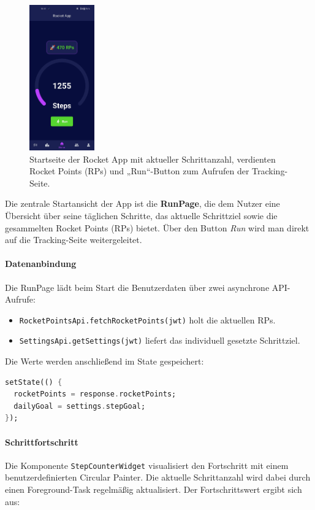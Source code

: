 \documentclass[11pt,a4paper]{article}
\begin{document}
\begin{figure}[H]
    \centering
    \includegraphics[width=0.25\textwidth]{images/apps/start-page.jpg}
    \caption{Startseite der Rocket App mit aktueller Schrittanzahl, verdienten Rocket Points (RPs) und „Run“-Button zum Aufrufen der Tracking-Seite.}
    \label{fig:validation-workflow}
\end{figure}

Die zentrale Startansicht der App ist die \textbf{RunPage}, die dem Nutzer eine Übersicht über seine täglichen Schritte, das aktuelle Schrittziel sowie die gesammelten Rocket Points (RPs) bietet. Über den Button \textit{Run} wird man direkt auf die Tracking-Seite weitergeleitet.

\paragraph{Datenanbindung}
Die RunPage lädt beim Start die Benutzerdaten über zwei asynchrone API-Aufrufe:
\begin{itemize}
    \item \texttt{RocketPointsApi.fetchRocketPoints(jwt)} holt die aktuellen RPs.
    \item \texttt{SettingsApi.getSettings(jwt)} liefert das individuell gesetzte Schrittziel.
\end{itemize}

Die Werte werden anschließend im State gespeichert:
\begin{lstlisting}[language=Dart, caption=Speichern von RP und Schrittziel]
setState(() {
  rocketPoints = response.rocketPoints;
  dailyGoal = settings.stepGoal;
});
\end{lstlisting}

\paragraph{Schrittfortschritt}
Die Komponente \texttt{StepCounterWidget} visualisiert den Fortschritt mit einem benutzerdefinierten Circular Painter. Die aktuelle Schrittanzahl wird dabei durch einen Foreground-Task regelmäßig aktualisiert. Der Fortschrittswert ergibt sich aus:
\end{document}

